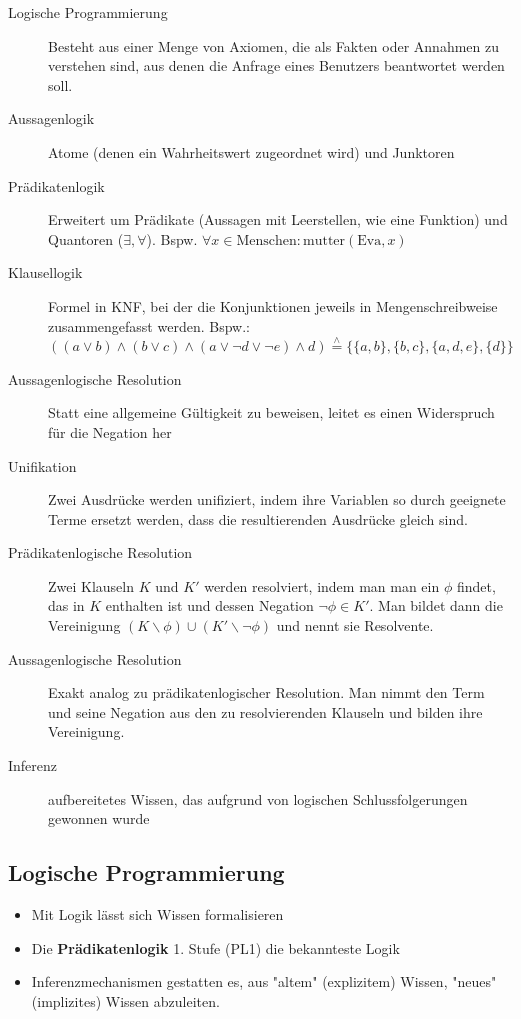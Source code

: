 \documentclass[runningheads,deutsch]{llncs}
\newcommand{\estimates}{\overset{\scriptscriptstyle\wedge}{=}}
\begin{document}
\begin{description}
    \item[Logische Programmierung] Besteht aus einer Menge von Axiomen, die als Fakten oder Annahmen zu verstehen sind, aus denen die Anfrage eines Benutzers beantwortet werden soll. 
    \item[Aussagenlogik] Atome (denen ein Wahrheitswert zugeordnet wird) und Junktoren
    \item[Prädikatenlogik] Erweitert um Prädikate (Aussagen mit Leerstellen, wie eine Funktion) und Quantoren ($\exists, \forall$). Bspw. $\forall x \in \text{Menschen}: \text{mutter}(\text{Eva}, x)$
    \item[Klausellogik] Formel in KNF, bei der die Konjunktionen jeweils in Mengenschreibweise zusammengefasst werden. Bspw.: \\
    $((a \lor b) \land (b \lor c) \land (a \lor \lnot d \lor \lnot e) \land d) \estimates \{\{a,b\}, \{b, c\}, \{a, d, e\}, \{d\}\}$
    \item[Aussagenlogische Resolution] Statt eine allgemeine Gültigkeit zu beweisen, leitet es einen Widerspruch für die Negation her    
    \item[Unifikation] Zwei Ausdrücke werden unifiziert, indem ihre Variablen so durch geeignete Terme ersetzt werden, dass die resultierenden Ausdrücke gleich sind.
    \item[Prädikatenlogische Resolution] Zwei Klauseln $K$ und $K'$ werden resolviert, indem man man ein $\phi$ findet, das in $K$ enthalten ist und dessen Negation $\lnot\phi \in K'$. Man bildet dann die Vereinigung $(K \backslash \phi) \cup (K' \backslash \lnot\phi)$ und nennt sie Resolvente.
    \item[Aussagenlogische Resolution] Exakt analog zu prädikatenlogischer Resolution. Man nimmt den Term und seine Negation aus den zu resolvierenden Klauseln und bilden ihre Vereinigung.
    \item[Inferenz] aufbereitetes Wissen, das aufgrund von logischen Schlussfolgerungen gewonnen wurde
\end{description}

\subsection{Logische Programmierung}
\begin{itemize}
    \item Mit Logik lässt sich Wissen formalisieren
    \item Die \textbf{Prädikatenlogik} 1. Stufe (PL1) die bekannteste Logik
    \item Inferenzmechanismen gestatten es, aus "altem" (explizitem) Wissen, "neues" (implizites) Wissen abzuleiten.
\end{itemize}
\end{document}

